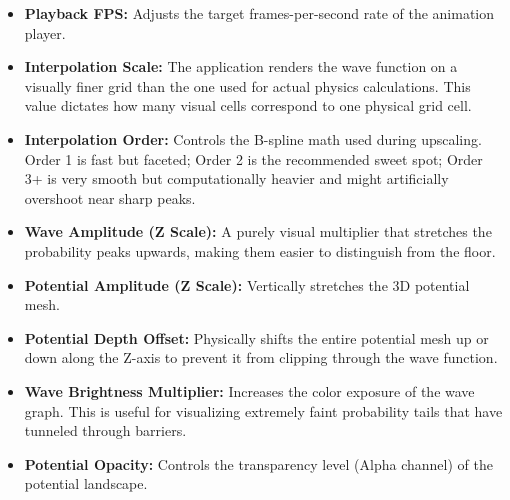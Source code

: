 \documentclass[11pt, a4paper]{article}
\begin{document}
\begin{itemize}
    \item \textbf{Playback FPS:} Adjusts the target frames-per-second rate of the animation player.
    \item \textbf{Interpolation Scale:} The application renders the wave function on a visually finer grid than the one used for actual physics calculations. This value dictates how many visual cells correspond to one physical grid cell.
    \item \textbf{Interpolation Order:} Controls the B-spline math used during upscaling. Order 1 is fast but faceted; Order 2 is the recommended sweet spot; Order 3+ is very smooth but computationally heavier and might artificially overshoot near sharp peaks.
    \item \textbf{Wave Amplitude (Z Scale):} A purely visual multiplier that stretches the probability peaks upwards, making them easier to distinguish from the floor.
    \item \textbf{Potential Amplitude (Z Scale):} Vertically stretches the 3D potential mesh.
    \item \textbf{Potential Depth Offset:} Physically shifts the entire potential mesh up or down along the Z-axis to prevent it from clipping through the wave function.
    \item \textbf{Wave Brightness Multiplier:} Increases the color exposure of the wave graph. This is useful for visualizing extremely faint probability tails that have tunneled through barriers.
    \item \textbf{Potential Opacity:} Controls the transparency level (Alpha channel) of the potential landscape.
\end{itemize}
\end{document}
